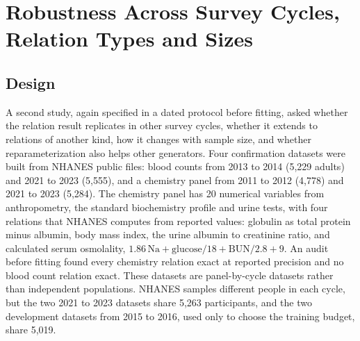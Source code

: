\documentclass[conference]{IEEEtran}
\begin{document}
\section{Robustness Across Survey Cycles, Relation Types and Sizes}

\subsection*{Design}

A second study, again specified in a dated protocol before fitting, asked whether the relation result replicates in other survey cycles, whether it extends to relations of another kind, how it changes with sample size, and whether reparameterization also helps other generators. Four confirmation datasets were built from NHANES public files: blood counts from 2013 to 2014 (5,229 adults) and 2021 to 2023 (5,555), and a chemistry panel from 2011 to 2012 (4,778) and 2021 to 2023 (5,284). The chemistry panel has 20 numerical variables from anthropometry, the standard biochemistry profile and urine tests, with four relations that NHANES computes from reported values: globulin as total protein minus albumin, body mass index, the urine albumin to creatinine ratio, and calculated serum osmolality, $1.86\,\mathrm{Na} + \mathrm{glucose}/18 + \mathrm{BUN}/2.8 + 9$. An audit before fitting found every chemistry relation exact at reported precision and no blood count relation exact. These datasets are panel-by-cycle datasets rather than independent populations. NHANES samples different people in each cycle, but the two 2021 to 2023 datasets share 5,263 participants, and the two development datasets from 2015 to 2016, used only to choose the training budget, share 5,019.
\end{document}
